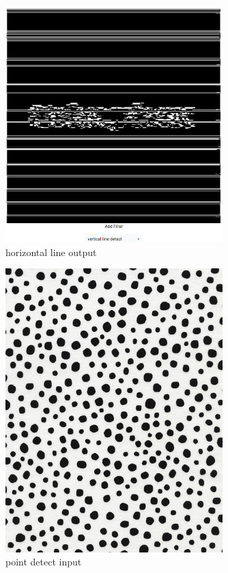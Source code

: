 \documentclass{article}
\begin{document}
  \begin{figure}[!htb]
    \centering
    \includegraphics[width=0.75\textwidth]{assets/horizontal_line_output.png}
    \caption{horizontal line output}
    \label{fig:horizontal-line-output}
  \end{figure}

  \begin{figure}[!htb]
    \centering
    \includegraphics[width=0.75\textwidth]{assets/original_points.png}
    \caption{point detect input}
    \label{fig:original-points}
  \end{figure}
\end{document}

